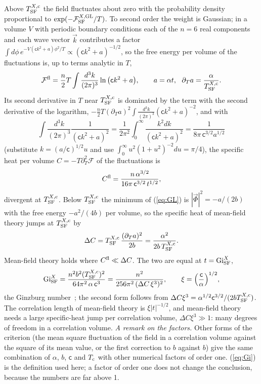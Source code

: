 \documentclass[aps,prd,onecolumn,superscriptaddress,nofootinbib,floatfix,longbibliography]{revtex4-2}
\newcommand{\SF}{{\rm SF}}
\begin{document}
Above $T^{X,{\rm c}}_\SF$ the field fluctuates about zero with the probability density proportional to $\exp(-\mathcal F^{X,{\rm GL}}_\SF/T)$. To
second order the weight is Gaussian; in a volume $V$ with periodic boundary conditions each of the $n=6$ real components and each
wave vector $\vec k$ contributes a factor $\int d\phi\,e^{-V(\mathsf ck^2+a)\phi^2/T}\propto(\mathsf ck^2+a)^{-1/2}$, so the free energy per volume
of the fluctuations is, up to terms analytic in $T$,
\begin{equation}
\mathcal F^{\rm fl}=\frac n2T\int\frac{d^3k}{(2\pi)^3}\ln\big(\mathsf ck^2+a\big),\qquad a=\alpha t,\ \ \partial_Ta=\frac{\alpha}{T^{X,{\rm c}}_\SF}.
\label{eq:Ffl}
\end{equation}
Its second derivative in $T$ near $T^{X,{\rm c}}_\SF$ is dominated by the term with the second derivative of the logarithm,
$-\frac n2T(\partial_Ta)^2\int\frac{d^3k}{(2\pi)^3}(\mathsf ck^2+a)^{-2}$, and with
\begin{equation}
\int\frac{d^3k}{(2\pi)^3}\frac1{(\mathsf ck^2+a)^2}=\frac1{2\pi^2}\int_0^\infty\frac{k^2dk}{(\mathsf ck^2+a)^2}=\frac{1}{8\pi\,\mathsf c^{3/2}a^{1/2}}
\label{eq:integral}
\end{equation}
(substitute $k=(a/\mathsf c)^{1/2}u$ and use $\int_0^\infty u^2(1+u^2)^{-2}du=\pi/4$), the specific heat per volume
$C=-T\partial_T^2\mathcal F$ of the fluctuations is
\begin{equation}
C^{\rm fl}=\frac{n\,\alpha^{3/2}}{16\pi\,\mathsf c^{3/2}\,t^{1/2}},
\label{eq:Cfl}
\end{equation}
divergent at $T^{X,{\rm c}}_\SF$. Below $T^{X,{\rm c}}_\SF$ the minimum of (\ref{eq:GL}) is $|\vec\Phi|^2=-a/(2b)$ with the free energy $-a^2/(4b)$ per
volume, so the specific heat of mean-field theory jumps at $T^{X,{\rm c}}_\SF$ by
\begin{equation}
\Delta C=T^{X,{\rm c}}_\SF\,\frac{(\partial_Ta)^2}{2b}=\frac{\alpha^2}{2b\,T^{X,{\rm c}}_\SF}.
\label{eq:DC}
\end{equation}
Mean-field theory holds where $C^{\rm fl}\ll\Delta C$. The two are equal at $t={\rm Gi}^X_\SF$,
\begin{equation}
{\rm Gi}^X_\SF=\frac{n^2b^2(T^{X,{\rm c}}_\SF)^2}{64\pi^2\,\alpha\,\mathsf c^3}=\frac{n^2}{256\pi^2\,(\Delta C\,\xi^3)^2},\qquad\xi=\Big(\frac{\mathsf c}{\alpha}\Big)^{1/2},
\label{eq:Gi}
\end{equation}
the Ginzburg number~\cite{Levanyuk1959,Ginzburg1960}; the second form follows from $\Delta C\xi^3=\alpha^{1/2}\mathsf c^{3/2}/(2bT^{X,{\rm c}}_\SF)$. The
correlation length of mean-field theory is $\xi|t|^{-1/2}$, and mean-field theory needs a large specific-heat jump per correlation
volume, $\Delta C\xi^3\gg1$: many degrees of freedom in a correlation volume. \emph{A remark on the factors.} Other forms of the
criterion (the mean square fluctuation of the field in a correlation volume against the square of its mean value, or the first
correction to $b$ against $b$) give the same combination of $\alpha$, $b$, $\mathsf c$ and $T_{\rm c}$ with other numerical factors of order
one. (\ref{eq:Gi}) is the definition used here; a factor of order one does not change the conclusion, because the numbers are far
above 1.
\end{document}
